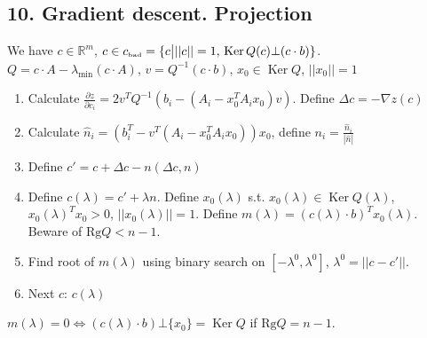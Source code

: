 \documentclass[a4paper]{article}
\DeclareMathOperator{\Ker}{Ker}
\begin{document}
\subsection*{10. Gradient descent. Projection}
We have $c\in\mathbb{R}^m$, $c\in c_{\mbox{\tiny bad}}=\{c\big| ||c||=1,\,\Ker Q(c)\bot (c\cdot b)\}$. $Q=c\cdot A-\lambda_{\min}(c\cdot A)$, $v=Q^{-1}(c\cdot b)$, $x_0\in\Ker Q$, $||x_0||=1$
\begin{enumerate}
\item Calculate $\frac{\partial z}{\partial c_i}=2v^TQ^{-1}(b_i-(A_i-x_0^TA_ix_0)v)$. Define $\Delta c=-\nabla z(c)$
\item Calculate $\hat{n}_i=\left(b_i^T-v^T(A_i-x_0^TA_ix_0)\right)x_0$, define $n_i=\frac{\hat{n}_i}{|\hat{n}|}$
\item Define $c'=c+\Delta c-n(\Delta c, n)$
\item Define $c(\lambda)=c'+\lambda n$. Define $x_0(\lambda)$ s.t. $x_0(\lambda)\in \Ker Q(\lambda)$, $x_0(\lambda)^Tx_0>0$, $||x_0(\lambda)||=1$. Define $m(\lambda)=(c(\lambda)\cdot b)^Tx_0(\lambda)$. Beware of $\mbox{Rg}Q<n-1$.
\item Find root of $m(\lambda)$ using binary search on $[-\lambda^0,\lambda^0]$, $\lambda^0=||c-c'||$.
\item Next $c$: $c(\lambda)$
\end{enumerate}

$m(\lambda)=0\Leftrightarrow (c(\lambda)\cdot b)\bot\{x_0\}=\Ker Q$ if $\mbox{Rg}Q=n-1$.
\end{document}
